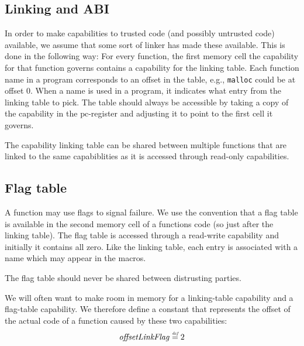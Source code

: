 \documentclass[a4paper]{article}
\newcommand{\defeq}{\stackrel{\textit{\tiny{def}}}{=}}
\newcommand{\var}[1]{\mathit{#1}}
\newcommand{\pcreg}{\mathrm{pc}}
\newcommand{\olf}{\var{offsetLinkFlag}}
\begin{document}
              \subsection{Linking and ABI}
              In order to make capabilities to trusted code (and possibly untrusted code) available, we assume that some sort of linker has made these available. This is done in the following way: For every function, the first memory cell the capability for that function governs contains a capability for the linking table. Each function name in a program corresponds to an offset in the table, e.g., \texttt{malloc} could be at offset 0. When a name is used in a program, it indicates what entry from the linking table to pick. The table should always be accessible by taking a copy of the capability in the $\pcreg$-register and adjusting it to point to the first cell it governs.

              The capability linking table can be shared between multiple functions that are linked to the same capabiblities as it is accessed through read-only capabilities.

              \subsection{Flag table}
              A function may use flags to signal failure. We use the convention that a flag table is available in the second memory cell of a functions code (so just after the linking table). The flag table is accessed through a read-write capability and initially it contains all zero. Like the linking table, each entry is associated with a name which may appear in the macros.

              The flag table should never be shared between distrusting parties.

              We will often want to make room in memory for a linking-table capability and a flag-table capability. We therefore define a constant that represents the offset of the actual code of a function caused by these two capabilities:
              \[
                \olf \defeq 2
              \]
\end{document}
